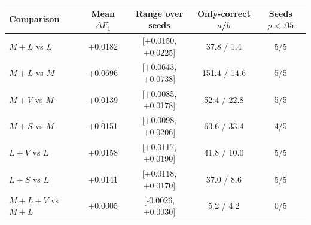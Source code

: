 \begin{tabular}{@{}lcccc@{}}
\toprule
Comparison & Mean $\Delta F_1$ & Range over seeds & Only-correct $a$/$b$ & Seeds $p<.05$ \\
\midrule
$M+L$ vs $L$ & +0.0182 & [+0.0150, +0.0225] & 37.8 / 1.4 & 5/5 \\
$M+L$ vs $M$ & +0.0696 & [+0.0643, +0.0738] & 151.4 / 14.6 & 5/5 \\
$M+V$ vs $M$ & +0.0139 & [+0.0085, +0.0178] & 52.4 / 22.8 & 5/5 \\
$M+S$ vs $M$ & +0.0151 & [+0.0098, +0.0206] & 63.6 / 33.4 & 4/5 \\
$L+V$ vs $L$ & +0.0158 & [+0.0117, +0.0190] & 41.8 / 10.0 & 5/5 \\
$L+S$ vs $L$ & +0.0141 & [+0.0118, +0.0170] & 37.0 / 8.6 & 5/5 \\
$M+L+V$ vs $M+L$ & +0.0005 & [-0.0026, +0.0030] & 5.2 / 4.2 & 0/5 \\
\bottomrule
\end{tabular}
